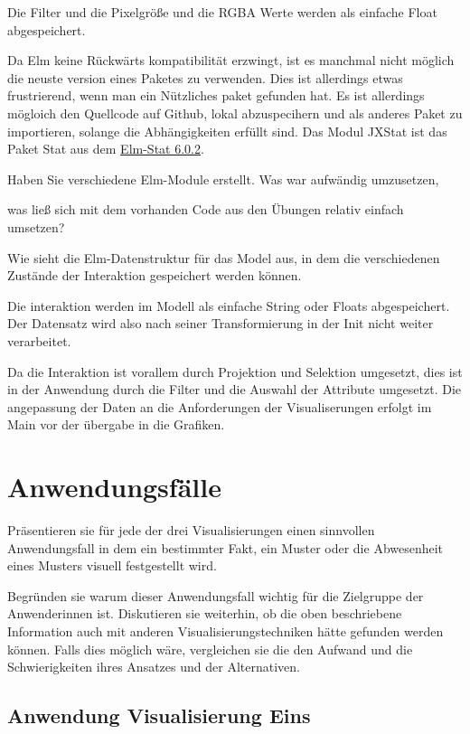 \documentclass[usegeometry=true]{scrartcl}
\begin{document}
Die Filter und die Pixelgröße und die RGBA Werte werden als einfache Float abgespeichert.

Da Elm keine Rückwärts kompatibilität erzwingt, ist es manchmal nicht möglich die neuste version eines Paketes zu verwenden. 
Dies ist allerdings etwas frustrierend, wenn man ein Nützliches paket gefunden hat. Es ist allerdings mögloich den Quellcode auf 
Github, lokal abzuspecihern und als anderes Paket zu importieren, solange die Abhängigkeiten erfüllt sind. Das Modul JXStat ist das Paket Stat aus dem \href{https://github.com/jxxcarlson/elm-stat/blob/6.0.2/src/Stat.elm}{Elm-Stat 6.0.2}. 

 Haben Sie verschiedene Elm-Module erstellt. Was war aufwändig umzusetzen, 

 was ließ sich mit dem vorhanden Code aus den Übungen relativ einfach umsetzen? 

Wie sieht die Elm-Datenstruktur für das Model aus, in dem die verschiedenen Zustände der Interaktion gespeichert werden können.

Die interaktion werden im Modell als einfache String oder Floats abgespeichert. Der Datensatz wird also nach seiner Transformierung in der Init  nicht weiter verarbeitet.

Da die Interaktion ist vorallem durch Projektion und Selektion umgesetzt, dies ist in der Anwendung durch die Filter und die Auswahl der Attribute umgesetzt.
Die angepassung der Daten an die Anforderungen der Visualiserungen erfolgt im Main vor der übergabe in die Grafiken. 



\section{Anwendungsfälle}
Präsentieren sie für jede der drei Visualisierungen einen sinnvollen Anwendungsfall 
in dem ein bestimmter Fakt, ein Muster oder die Abwesenheit eines Musters visuell festgestellt wird.


Begründen sie warum dieser Anwendungsfall wichtig für die Zielgruppe der Anwenderinnen ist.
Diskutieren sie weiterhin, ob die oben beschriebene Information auch mit anderen 
Visualisierungstechniken hätte gefunden werden können.
Falls dies möglich wäre, vergleichen sie die den Aufwand und die Schwierigkeiten ihres Ansatzes und der Alternativen. 
\subsection{Anwendung Visualisierung Eins}
\end{document}
